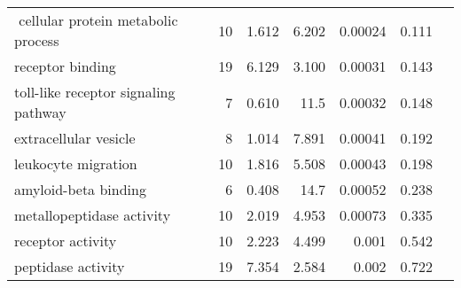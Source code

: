 \begin{longtable}{|l|r|r|r|r|r|}
$$           cellular protein metabolic process &                      10 &                   1.612 &      6.202 &              0.00024 &                        0.111~~ \\
                             receptor binding &                      19 &                   6.129 &      3.100 &              0.00031 &                        0.143~~ \\
         toll-like receptor signaling pathway &                       7 &                   0.610 &       11.5 &              0.00032 &                        0.148~~ \\
                        extracellular vesicle &                       8 &                   1.014 &      7.891 &              0.00041 &                        0.192~~ \\
                          leukocyte migration &                      10 &                   1.816 &      5.508 &              0.00043 &                        0.198~~ \\
                         amyloid-beta binding &                       6 &                   0.408 &       14.7 &              0.00052 &                        0.238~~ \\
                    metallopeptidase activity &                      10 &                   2.019 &      4.953 &              0.00073 &                        0.335~~ \\
                            receptor activity &                      10 &                   2.223 &      4.499 &                0.001 &                        0.542~~ \\
                           peptidase activity &                      19 &                   7.354 &      2.584 &                0.002 &                        0.722~~ \\
\end{longtable}
